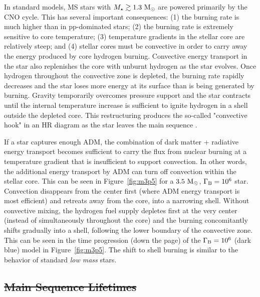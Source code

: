 \documentclass[useAMS,usenatbib]{mnras}
\providecommand{\DIFdel}[1]{{\protect\color{red}\sout{#1}}}                      %
\providecommand{\DIFdelbegin}{} %
\newcommand{\DIFscaledelfig}{0.5}
\newlength{\DIFdelgraphicswidth} %
\newlength{\DIFdelgraphicsheight} %
\newcommand{\DIFdelincludegraphics}[2][]{%
\sbox{\DIFdelgraphicsbox}{\DIFOincludegraphics[#1]{#2}}%
\settoboxwidth{\DIFdelgraphicswidth}{\DIFdelgraphicsbox} %
\settoboxtotalheight{\DIFdelgraphicsheight}{\DIFdelgraphicsbox} %
\scalebox{\DIFscaledelfig}{%
\parbox[b]{\DIFdelgraphicswidth}{\usebox{\DIFdelgraphicsbox}\\[-\baselineskip] \rule{\DIFdelgraphicswidth}{0em}}\llap{\resizebox{\DIFdelgraphicswidth}{\DIFdelgraphicsheight}{%
\setlength{\unitlength}{\DIFdelgraphicswidth}%
\begin{picture}(1,1)%
\thicklines\linethickness{2pt} %
{\color[rgb]{1,0,0}\put(0,0){\framebox(1,1){}}}%
{\color[rgb]{1,0,0}\put(0,0){\line( 1,1){1}}}%
{\color[rgb]{1,0,0}\put(0,1){\line(1,-1){1}}}%
\end{picture}%
}\hspace*{3pt}}} %
} %
\DeclareRobustCommand{\DIFdelbegin}{\DIFOdelbegin \let\includegraphics\DIFdelincludegraphics} %
\begin{document}
In standard models, MS stars with $M_{\star} \gtrsim 1.3 \ \mathrm{M}_{\odot}$ 
are powered primarily by the CNO cycle.
This has several important consequences:
(1) the burning rate is much higher than in pp-dominated stars;
(2) the burning rate is extremely sensitive to core temperature; 
(3) temperature gradients in the stellar core are relatively steep; 
and (4) stellar cores must be convective in order 
to carry away the energy produced by core hydrogen burning. 
Convective energy transport in the star also replenishes the 
core with unburnt hydrogen as the star evolves.
Once hydrogen throughout the convective zone is depleted, 
the burning rate rapidly decreases and 
the star loses more energy at its surface than is 
being generated by burning. Gravity temporarily overcomes pressure support and 
the star contracts until the internal temperature increase is sufficient 
to ignite hydrogen in a shell outside the depleted core. This restructuring 
produces the so-called "convective hook" in an HR diagram 
as the star leaves the main sequence \citep{Kippenhahn2012}.

If a star captures enough ADM, the combination of dark matter + radiative energy 
transport becomes sufficient to carry the flux from nuclear burning at a 
temperature gradient that is insufficient to support convection. 
In other words, the additional energy transport by ADM can turn off convection within the stellar core. 
This can be seen in 
Figure~\ref{fig:m3p5} for a $3.5 \ \mathrm{M}_{\odot}$, $\Gamma_\mathrm{B} = 10^{6}$ star. 
Convection disappears from the center first 
(where ADM energy transport is most efficient) 
and retreats away from the core, into a narrowing shell. 
Without convective mixing, the hydrogen fuel supply depletes first 
at the very center (instead of simultaneously throughout the core) and 
the burning concomitantly shifts gradually into a shell, 
following the lower boundary of the convective zone. 
This can be seen in the time progression (down the page) 
of the $\Gamma_\mathrm{B} = 10^{6}$ (dark blue) model in Figure~\ref{fig:m3p5}. 
The shift to shell burning is similar to the behavior of standard {\em low mass} 
stars.


\DIFdelbegin \subsection{\DIFdel{Main Sequence Lifetimes}}
\addtocounter{subsection}{-1}%
\end{document}
